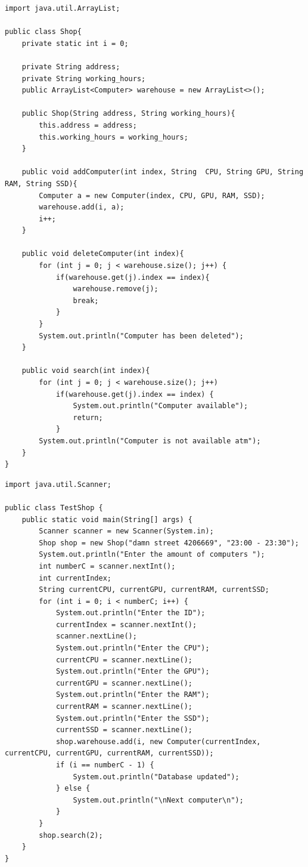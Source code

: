 \documentclass[14pt, a4paper]{extarticle}
\newenvironment{code}{\captionsetup{type=listing}}{}
\begin{document}
\begin{code}
\begin{Verbatim}[frame=single, fontsize=\footnotesize]
import java.util.ArrayList;

public class Shop{
    private static int i = 0;

    private String address;
    private String working_hours;
    public ArrayList<Computer> warehouse = new ArrayList<>();

    public Shop(String address, String working_hours){
        this.address = address;
        this.working_hours = working_hours;
    }

    public void addComputer(int index, String  CPU, String GPU, String RAM, String SSD){
        Computer a = new Computer(index, CPU, GPU, RAM, SSD);
        warehouse.add(i, a);
        i++;
    }

    public void deleteComputer(int index){
        for (int j = 0; j < warehouse.size(); j++) {
            if(warehouse.get(j).index == index){
                warehouse.remove(j);
                break;
            }
        }
        System.out.println("Computer has been deleted");
    }

    public void search(int index){
        for (int j = 0; j < warehouse.size(); j++)
            if(warehouse.get(j).index == index) {
                System.out.println("Computer available");
                return;
            }
        System.out.println("Computer is not available atm");
    }
}
\end{Verbatim}
\end{code}

\begin{code}
\begin{Verbatim}[frame=single, fontsize=\footnotesize]
import java.util.Scanner;

public class TestShop {
    public static void main(String[] args) {
        Scanner scanner = new Scanner(System.in);
        Shop shop = new Shop("damn street 4206669", "23:00 - 23:30");
        System.out.println("Enter the amount of computers ");
        int numberC = scanner.nextInt();
        int currentIndex;
        String currentCPU, currentGPU, currentRAM, currentSSD;
        for (int i = 0; i < numberC; i++) {
            System.out.println("Enter the ID");
            currentIndex = scanner.nextInt();
            scanner.nextLine();
            System.out.println("Enter the CPU");
            currentCPU = scanner.nextLine();
            System.out.println("Enter the GPU");
            currentGPU = scanner.nextLine();
            System.out.println("Enter the RAM");
            currentRAM = scanner.nextLine();
            System.out.println("Enter the SSD");
            currentSSD = scanner.nextLine();
            shop.warehouse.add(i, new Computer(currentIndex, currentCPU, currentGPU, currentRAM, currentSSD));
            if (i == numberC - 1) {
                System.out.println("Database updated");
            } else {
                System.out.println("\nNext computer\n");
            }
        }
        shop.search(2);
    }
}
\end{Verbatim}
\end{code}
\end{document}
